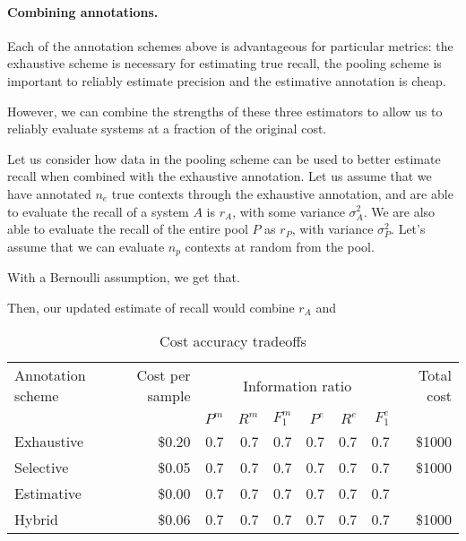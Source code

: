 \paragraph{Combining annotations.}

Each of the annotation schemes above is advantageous for particular metrics: the exhaustive scheme is necessary for estimating true recall, the pooling scheme is important to reliably estimate precision and the estimative annotation is cheap.

However, we can combine the strengths of these three estimators to allow us to reliably evaluate systems at a fraction of the original cost.

Let us consider how data in the pooling scheme can be used to better estimate recall when combined with the exhaustive annotation.
Let us assume that we have annotated $n_e$ true contexts through the exhaustive annotation, and are able to evaluate the recall of a system $A$ is $r_A$, with some variance $\sigma^2_A$.
We are also able to evaluate the recall of the entire pool $P$ as $r_P$, with variance $\sigma^2_P$.
Let's assume that we can evaluate $n_p$ contexts at random from the pool. 

With a Bernoulli assumption, we get that.

Then, our updated estimate of recall would combine $r_A$ and 


\begin{table*}
  \begin{tabular}{l r r r r r r r r} \toprule
    Annotation scheme & Cost per sample & \multicolumn{6}{c}{Information ratio} & Total cost \\ 
                      &                      & $P^m$ & $R^m$ & $F_1^m$ & $P^e$ & $R^e$ & $F_1^e$ &  \\ \midrule
    Exhaustive & \$0.20 & 0.7 & 0.7 & 0.7 & 0.7 & 0.7 & 0.7 & \$1000 \\
    Selective  & \$0.05 & 0.7 & 0.7 & 0.7 & 0.7 & 0.7 & 0.7 & \$1000 \\
    Estimative & \$0.00 & 0.7 & 0.7 & 0.7 & 0.7 & 0.7 & 0.7 &  \\
    Hybrid     & \$0.06 & 0.7 & 0.7 & 0.7 & 0.7 & 0.7 & 0.7 & \$1000 \\ \bottomrule
  \end{tabular}
  \caption{Cost accuracy tradeoffs}
\end{table*}

